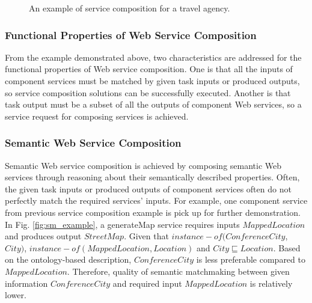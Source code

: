 \begin{figure}
\centerline{
}
\caption{An example of service composition for a travel agency.}
\label{fig:wsc_example}
\end{figure}

\subsubsection{Functional Properties of Web Service Composition}
From the example demonstrated above, two characteristics are addressed for the functional properties of Web service composition. One is that all the inputs of component services must be matched by given task inputs or produced outputs, so  service composition solutions can be successfully executed. Another is that task output must be a subset of all the outputs of component Web services, so a service request for composing services is achieved. 


\subsubsection{Semantic Web Service Composition}

Semantic Web service composition is achieved by composing semantic Web services through reasoning about their semantically described properties. Often, the given task inputs or produced outputs of component services often do not perfectly match the required services' inputs. For example, one component service from previous service composition example is pick up for further demonstration. In Fig. \ref{fig:sm_example}, a generateMap service requires inputs $MappedLocation$ and produces output $StreetMap$. Given that $instance-of (ConferenceCity$, $City)$, $instance-of (MappedLocation, Location)$ and $City \sqsubseteq Location$. Based on the ontology-based description, $ConferenceCity$ is less preferable compared to $MappedLocation$. Therefore, quality of semantic matchmaking between given information $ConferenceCity$ and required input $MappedLocation$ is relatively lower. 


